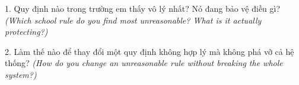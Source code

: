 \begin{tuhocnhanh}
1. Quy định nào trong trường em thấy vô lý nhất? Nó đang bảo vệ điều gì? \textit{(Which school rule do you find most unreasonable? What is it actually protecting?)}

2. Làm thế nào để thay đổi một quy định không hợp lý mà không phá vỡ cả hệ thống? \textit{(How do you change an unreasonable rule without breaking the whole system?)}
\end{tuhocnhanh}

\ngancach
